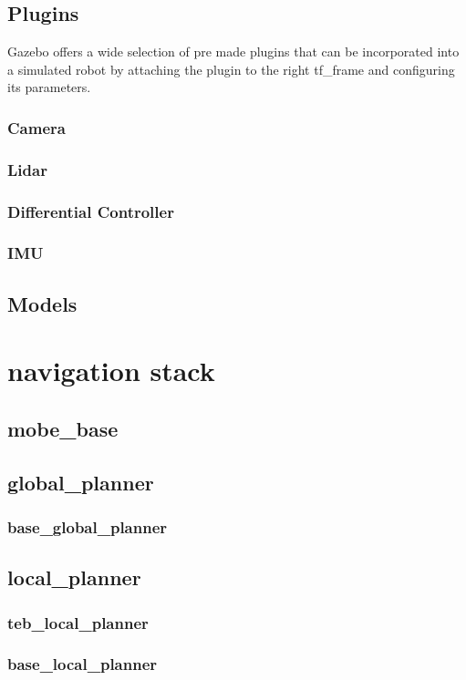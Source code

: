 \subsection{Plugins}
Gazebo offers a wide selection of pre made plugins that can be incorporated into a simulated robot by attaching the plugin to the right tf\_frame and configuring its parameters.
\subsubsection{Camera}
\subsubsection{Lidar}
\subsubsection{Differential Controller}
\subsubsection{IMU}
\subsection{Models}


\section{navigation stack}
\subsection{mobe\_base}
\subsection{global\_planner}
\subsubsection{base\_global\_planner}
\subsection{local\_planner}
\subsubsection{teb\_local\_planner}
\subsubsection{base\_local\_planner}
